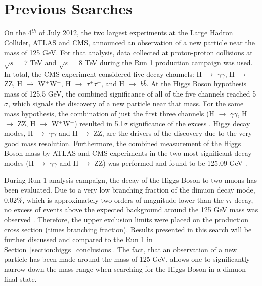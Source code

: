 \section{Previous Searches} \label{section:higgs_run1results}
On the 4$^{th}$ of July 2012, the two largest experiments at the Large Hadron Collider, ATLAS and CMS, announced an observation of a new particle near the mass of 125 GeV. For that analysis, data collected at proton-proton collisions at $\sqrt{s} = 7$ TeV and $\sqrt{s} = 8$ TeV during the Run 1 production campaign was used. In total, the CMS experiment considered five decay channels: H $\rightarrow$ $\gamma\gamma$, H $\rightarrow$ ZZ, H $\rightarrow$ W$^{+}$W$^{-}$, H $\rightarrow$ $\tau^{+}\tau^{-}$, and H $\rightarrow$ $b\bar{b}$. At the Higgs Boson hypothesis mass of 125.5 GeV, the combined significance of all of the five channels reached 5$\sigma$, which signals the discovery of a new particle near that mass. For the same mass hypothesis, the combination of just the first three channels (H $\rightarrow$ $\gamma\gamma$, H $\rightarrow$ ZZ, H $\rightarrow$ W$^{+}$W$^{-}$) resulted in 5.1$\sigma$ significance of the excess \cite{CMSHiggsRun1Observation}. Higgs decay modes, H $\rightarrow$ $\gamma\gamma$ and H $\rightarrow$ ZZ, are the drivers of the discovery due to the very good mass resolution. Furthermore, the combined measurement of the Higgs Boson mass by ATLAS and CMS experiments in the two most significant decay modes (H $\rightarrow$ $\gamma\gamma$ and H $\rightarrow$ ZZ) was performed and found to be 125.09 GeV \cite{Aad:2015zhl}.

During Run 1 analysis campaign, the decay of the Higgs Boson to two muons has been evaluated. Due to a very low branching fraction of the dimuon decay mode, 0.02\%, which is approximately two orders of magnitude lower than the $\tau\tau$ decay, no excess of events above the expected background around the 125 GeV mass was observed \cite{CMSHiggsRunI}. Therefore, the upper exclusion limits were placed on the production cross section (times branching fraction). Results presented in this search will be further discussed and compared to the Run 1 in Section~\ref{section:higgs_conclusions}. The fact, that an observation of a new particle has been made around the mass of 125 GeV, allows one to significantly narrow down the mass range when searching for the Higgs Boson in a dimuon final state.

